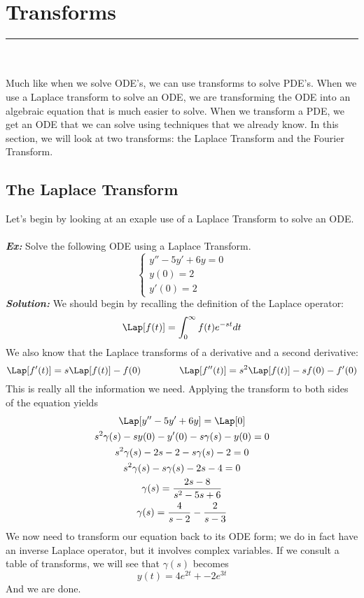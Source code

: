 \section{Transforms}
\hrule
\noindent \\\\
\indent Much like when we solve ODE's, we can use transforms to solve PDE's. When we use a Laplace
transform to solve an ODE, we are transforming the ODE into an algebraic equation that is much
easier to solve. When we transform a PDE, we get an ODE that we can solve using techniques that
we already know. In this section, we will look at two transforms: the Laplace Transform and the
Fourier Transform.\\
\subsection{The Laplace Transform}
\indent Let's begin by looking at an exaple use of a Laplace Transform to solve an ODE.\\\\
\noindent \textbf{\textit{Ex:}} Solve the following ODE using a Laplace Transform.
\[
\begin{cases*}
y'' - 5y' + 6y = 0\\
y(0) = 2\\
y'(0) = 2
\end{cases*}
\]
\indent \textbf{\textit{Solution:}} We should begin by recalling the definition of the Laplace operator:
\[
\Lap[f(t)] =\int_{0}^{\infty}f(t)e^{-st}dt
\]
We also know that the Laplace transforms of a derivative and a second derivative:
\[
\Lap[f'(t)] = s\Lap[f(t)] - f(0)\qquad\qquad \Lap[f''(t)] = s^{2}\Lap[f(t)]-sf(0)-f'(0)
\]
This is really all the information we need. Applying the transform to both sides of the equation yields
\begin{gather*}
\Lap[y'' - 5y' + 6y ] = \Lap[0]\\
s^{2}\gamma(s)-sy(0)-y'(0) - s\gamma(s)-y(0) = 0\\
s^{2}\gamma(s)-2s-2-s\gamma(s)-2 = 0\\
s^{2}\gamma(s)-s\gamma(s)-2s-4 = 0\\
\gamma(s) = \frac{2s - 8}{s^{2} -5s + 6}\\
\gamma(s) = \frac{4}{s-2}-\frac{2}{s-3}
\end{gather*}
We now need to transform our equation back to its ODE form; we do in fact have an inverse Laplace
operator, but it involves complex variables. If we consult a table of transforms, we will see that
$\gamma(s)$ becomes
\[
y(t) = 4e^{2t} +- 2e^{3t}
\]
And we are done.
\newpage


